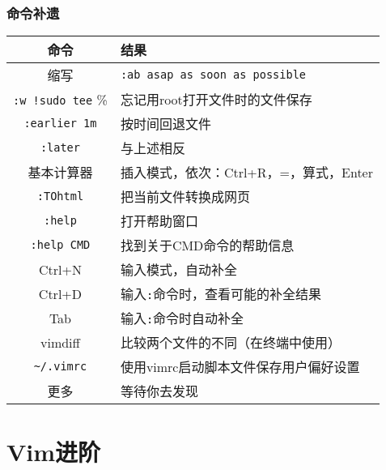 \begin{frame}[fragile]
  \frametitle{命令补遗}
  \begin{table}
    \centering
    \begin{tabularx}{\textwidth}{cX}
      \hline
      \rowcolor{blue!50}命令 & 结果\\
      \hline
      缩写 & \verb|:ab asap as soon as possible|\\
      \hline
      \verb|:w !sudo tee| \% & 忘记用root打开文件时的文件保存\\
      \hline
      \verb|:earlier 1m| & 按时间回退文件\\ 
      \verb|:later| & 与上述相反\\ 
      \hline
      基本计算器 & 插入模式，依次：Ctrl+R，=，算式，Enter\\
      \hline
      \verb|:TOhtml| & 把当前文件转换成网页\\
      \hline
      \verb|:help| & 打开帮助窗口\\
      \verb|:help CMD| & 找到关于CMD命令的帮助信息\\
      \hline
      Ctrl+N & 输入模式，自动补全\\
      \hline
      Ctrl+D & 输入\verb|:|命令时，查看可能的补全结果\\
      Tab & 输入\verb|:|命令时自动补全\\
      \hline
      vimdiff & 比较两个文件的不同（在终端中使用）\\
      \verb|~/.vimrc| & 使用vimrc启动脚本文件保存用户偏好设置\\
      \hline
      更多 & 等待你去发现\\
      \hline
    \end{tabularx}
  \end{table}
\end{frame}

\section{Vim进阶}
